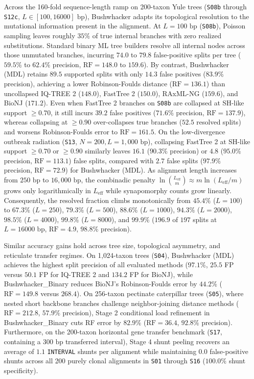 \documentclass[11pt,a4paper]{article}
\begin{document}
Across the 160-fold sequence-length ramp on 200-taxon Yule trees (\texttt{S08b} through \texttt{S12c}, $L \in [100, 16000]\text{ bp}$), Bushwhacker adapts its topological resolution to the mutational information present in the alignment. At $L = 100\text{ bp}$ (\texttt{S08b}), Poisson sampling leaves roughly $35\%$ of true internal branches with zero realized substitutions. Standard binary ML tree builders resolve all internal nodes across those unmutated branches, incurring $74.0$ to $79.8$ false-positive splits per tree ($59.5\%$ to $62.4\%$ precision, $\text{RF} = 148.0$ to $159.6$). By contrast, Bushwhacker (MDL) retains $89.5$ supported splits with only $14.3$ false positives ($83.9\%$ precision), achieving a lower Robinson-Foulds distance ($\text{RF} = 136.1$) than uncollapsed IQ-TREE 2 ($148.0$), FastTree 2 ($150.0$), RAxML-NG ($159.6$), and BioNJ ($171.2$). Even when FastTree 2 branches on \texttt{S08b} are collapsed at SH-like support $\ge 0.70$, it still incurs $39.2$ false positives ($71.6\%$ precision, $\text{RF} = 137.9$), whereas collapsing at $\ge 0.90$ over-collapses true branches ($52.5$ resolved splits) and worsens Robinson-Foulds error to $\text{RF} = 161.5$. On the low-divergence outbreak radiation (\texttt{S13}, $N = 200, L = 1,000\text{ bp}$), collapsing FastTree 2 at SH-like support $\ge 0.70$ or $\ge 0.90$ similarly leaves $16.1$ ($90.3\%$ precision) or $4.8$ ($95.0\%$ precision, $\text{RF} = 113.1$) false splits, compared with $2.7$ false splits ($97.9\%$ precision, $\text{RF} = 72.9$) for Bushwhacker (MDL). As alignment length increases from $250\text{ bp}$ to $16,000\text{ bp}$, the combinadic penalty $\ln\binom{L_{\text{eff}}}{m} \approx m\ln(L_{\text{eff}}/m)$ grows only logarithmically in $L_{\text{eff}}$ while synapomorphy counts grow linearly. Consequently, the resolved fraction climbs monotonically from $45.4\%$ ($L=100$) to $67.3\%$ ($L=250$), $79.3\%$ ($L=500$), $88.6\%$ ($L=1000$), $94.3\%$ ($L=2000$), $98.5\%$ ($L=4000$), $99.8\%$ ($L=8000$), and $99.9\%$ ($196.9$ of $197$ splits at $L=16000\text{ bp}$, $\text{RF} = 4.9$, $98.8\%$ precision).

Similar accuracy gains hold across tree size, topological asymmetry, and reticulate transfer regimes. On 1,024-taxon trees (\texttt{S04}), Bushwhacker (MDL) achieves the highest split precision of all evaluated methods ($97.1\%$, $25.5$ FP versus $50.1$ FP for IQ-TREE 2 and $134.2$ FP for BioNJ), while Bushwhacker\_Binary reduces BioNJ's Robinson-Foulds error by $44.2\%$ ($\text{RF} = 149.8$ versus $268.4$). On 256-taxon pectinate caterpillar trees (\texttt{S05}), where nested short backbone branches challenge neighbor-joining distance methods ($\text{RF} = 212.8$, $57.9\%$ precision), Stage 2 conditional load refinement in Bushwhacker\_Binary cuts RF error by $82.9\%$ ($\text{RF} = 36.4$, $92.8\%$ precision). Furthermore, on the 200-taxon horizontal gene transfer benchmark (\texttt{S17}, containing a $300\text{ bp}$ transferred interval), Stage 4 shunt peeling recovers an average of $1.1$ \texttt{INTERVAL} shunts per alignment while maintaining $0.0$ false-positive shunts across all 200 purely clonal alignments in \texttt{S01} through \texttt{S16} ($100.0\%$ shunt specificity).
\end{document}
